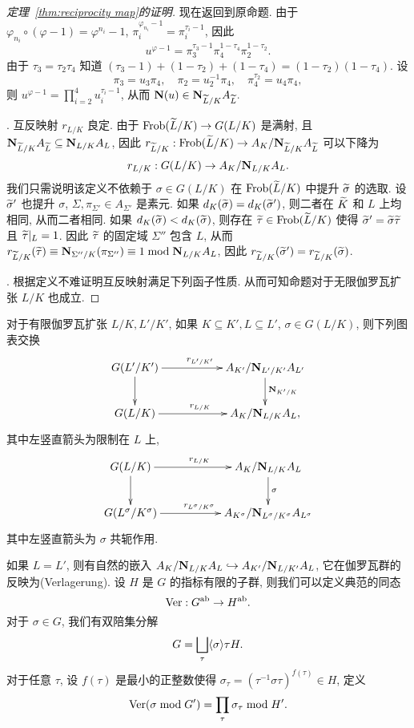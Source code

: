 \begin{proof}[定理~\ref{thm:reciprocity map}的证明]
现在返回到原命题. 由于 $\varphi_{n_i}\circ(\varphi -1)=\varphi^{n_i}-1$, $\pi_i^{\varphi_{n_i}-1}=\pi_i^{\tau_i-1}$, 因此
  \[u^{\varphi-1}=\pi_3^{\tau_3-1}\pi_4^{1-\tau_4}\pi_2^{1-\tau_2}.\]
由于 $\tau_3=\tau_2\tau_4$ 知道 $(\tau_3-1)+(1-\tau_2)+(1-\tau_4)=(1-\tau_2)(1-\tau_4)$. 设
  \[\pi_3=u_3\pi_4,\quad \pi_2=u_2^{-1}\pi_4,\quad \pi_4^{\tau_2}=u_4\pi_4,\]
则 $u^{\varphi-1}=\prod_{i=2}^4 u_i^{\tau_i-1}$, 从而 ${\mathbf{N}}(u)\in {\mathbf{N}}_{\widetilde L/K}A_{\widetilde L}.$

.
互反映射 $r_{L/K}$ 良定.
由于 ${\mathrm{Frob}}(\widetilde L/K)\to G(L/K)$ 是满射, 且 ${\mathbf{N}}_{\widetilde L/K}A_{\widetilde L}\subseteq {\mathbf{N}}_{L/K}A_L$, 因此
$r_{\widetilde L/K}:{\mathrm{Frob}}(\widetilde L/K)\to A_K/{\mathbf{N}}_{\widetilde L/K}A_{\widetilde L}$ 可以下降为
  \[r_{L/K}:G(L/K)\to A_K/{\mathbf{N}}_{L/K}A_L.\]
我们只需说明该定义不依赖于 $\sigma\in G(L/K)$ 在 ${\mathrm{Frob}}(\widetilde L/K)$ 中提升 $\widetilde \sigma$ 的选取. 设 $\widetilde\sigma'$ 也提升 $\sigma$, $\Sigma,\pi_{\Sigma'}\in A_{\Sigma'}$ 是素元. 如果 $d_K(\widetilde\sigma)=d_K(\widetilde \sigma')$, 则二者在 $\widetilde K$ 和 $L$ 上均相同, 从而二者相同. 如果 $d_K(\widetilde \sigma)<d_K(\widetilde\sigma)$, 则存在 $\widetilde\tau\in{\mathrm{Frob}}(\widetilde L/K)$ 使得 $\widetilde\sigma'=\widetilde\sigma\widetilde\tau$ 且 $\widetilde\tau|_L=1$. 因此 $\widetilde \tau$ 的固定域 $\Sigma''$ 包含 $L$, 从而 $r_{\widetilde L/K}(\widetilde\tau)\equiv {\mathbf{N}}_{\Sigma''/K}(\pi_{\Sigma''})\equiv 1\bmod{\mathbf{N}}_{L/K}A_L$, 因此 $r_{\widetilde L/K}(\widetilde\sigma')=r_{\widetilde L/K}(\widetilde\sigma)$.

.
根据定义不难证明互反映射满足下列函子性质.
从而可知命题对于无限伽罗瓦扩张 $L/K$ 也成立.
\end{proof}

\begin{proposition}{}{}
对于有限伽罗瓦扩张 $L/K,L'/K'$, 如果 $K\subseteq K',L\subseteq L'$, $\sigma\in G(L/K)$, 则下列图表交换
  \[\xymatrix{
G(L'/K')\ar[rr]^{r_{L'/K'}} \ar[d]&& A_{K'}/\bfN_{L'/K'}A_{L'}\ar[d]^{\bfN_{K'/K}}\\
G(L/K)\ar[rr]^{r_{L/K}}&&A_K/\bfN_{L/K}A_L,
}\]
其中左竖直箭头为限制在 $L$ 上, 
  \[\xymatrix{
    G(L/K)\ar[rr]^{r_{L/K}} \ar[d]&& A_K/\bfN_{L/K}A_L\ar[d]^{\sigma}\\
    G(L^\sigma/K^\sigma)\ar[rr]^{r_{L^\sigma/K^\sigma}}&&A_{K^\sigma}/\bfN_{L^\sigma/K^\sigma}A_{L^\sigma}
  }\]
其中左竖直箭头为 $\sigma$ 共轭作用. 
\end{proposition}

如果 $L=L'$, 则有自然的嵌入 $A_K/{\mathbf{N}}_{L/K}A_L\hookrightarrow A_{K'}/{\mathbf{N}}_{L/K'}A_L$, 它在伽罗瓦群的反映为(Verlagerung). 设 $H$ 是 $G$ 的指标有限的子群, 则我们可以定义典范的同态
  \[{\mathrm{Ver}}:G^{\mathrm{ab}}\to H^{\mathrm{ab}}.\]
对于 $\sigma\in G$, 我们有双陪集分解
  \[G=\bigsqcup_{\tau}\langle{\sigma}\rangle\tau H.\]
对于任意 $\tau$, 设 $f(\tau)$ 是最小的正整数使得 $\sigma_\tau=(\tau^{-1}\sigma\tau)^{f(\tau)}\in H$, 定义
  \[{\mathrm{Ver}}(\sigma\bmod G')=\prod_{\tau}\sigma_\tau\bmod H'.\]

